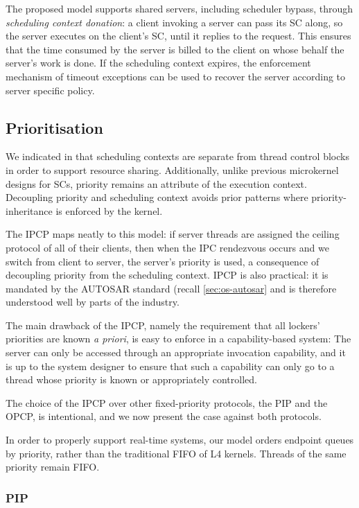 The proposed model supports shared servers, including scheduler
bypass, through \emph{scheduling context
donation}: a client invoking a server can pass its SC along, so the
server executes on the client's SC, until it replies to the
request. This ensures that the time consumed by the server is billed
to the client on whose behalf the server's work is done. If the scheduling context 
expires, the enforcement mechanism of timeout exceptions can be used to recover the server according 
to server specific policy.

\subsection{Prioritisation}

We indicated in  that scheduling contexts are separate from thread control blocks in
order to support resource sharing. Additionally, unlike previous microkernel designs for \glspl{SC}, priority
remains an attribute of the execution context. Decoupling priority and scheduling context avoids
prior patterns where priority-inheritance is enforced by the kernel. 

The \Gls{IPCP} maps neatly to this model: if server threads are assigned the ceiling protocol of all of
their clients, then when the \gls{IPC} rendezvous occurs and we switch from client to server, the
server's priority is used, a consequence of decoupling priority from the scheduling context.
\gls{IPCP} is also practical: it is mandated by the AUTOSAR standard
(recall \cref{sec:os-autosar} and is therefore understood well by parts of the industry.

The main drawback of the \gls{IPCP}, namely the requirement that all
lockers' priorities are known \emph{a priori}, is easy to enforce in a
capability-based system: The server can only be accessed through an
appropriate invocation capability, and it is up to the system designer
to ensure that such a capability can only go to a thread whose
priority is known or appropriately controlled.

The choice of the \gls{IPCP} over other fixed-priority protocols, the \gls{PIP} and the \gls{OPCP},
is intentional, and we now present the case against both protocols.

In order to properly support real-time systems, our model orders endpoint queues by priority, rather
than the traditional \gls{FIFO} of L4 kernels. Threads of the same priority remain FIFO. 

\subsubsection{\gls{PIP}}

